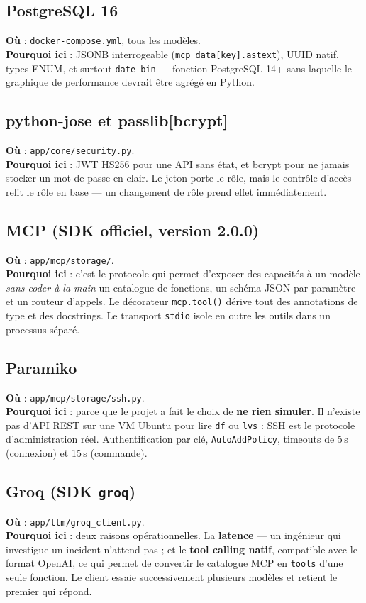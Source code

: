 \documentclass[11pt,a4paper]{report}
\newcommand{\file}[1]{\texttt{\small #1}}
\begin{document}
\subsection{PostgreSQL 16}
\textbf{Où} : \file{docker-compose.yml}, tous les modèles.\\
\textbf{Pourquoi ici} : JSONB interrogeable (\texttt{mcp\_data[key].astext}),
UUID natif, types ENUM, et surtout \texttt{date\_bin} --- fonction PostgreSQL
14+ sans laquelle le graphique de performance devrait être agrégé en Python.

\subsection{python-jose et passlib[bcrypt]}
\textbf{Où} : \file{app/core/security.py}.\\
\textbf{Pourquoi ici} : JWT HS256 pour une API sans état, et bcrypt pour ne
jamais stocker un mot de passe en clair. Le jeton porte le rôle, mais le contrôle
d'accès relit le rôle en base --- un changement de rôle prend effet
immédiatement.

\subsection{MCP (SDK officiel, version 2.0.0)}
\textbf{Où} : \file{app/mcp/storage/}.\\
\textbf{Pourquoi ici} : c'est le protocole qui permet d'exposer des capacités à
un modèle \emph{sans coder à la main} un catalogue de fonctions, un schéma JSON
par paramètre et un routeur d'appels. Le décorateur \texttt{mcp.tool()} dérive
tout des annotations de type et des docstrings. Le transport \texttt{stdio}
isole en outre les outils dans un processus séparé.

\subsection{Paramiko}
\textbf{Où} : \file{app/mcp/storage/ssh.py}.\\
\textbf{Pourquoi ici} : parce que le projet a fait le choix de \textbf{ne rien
simuler}. Il n'existe pas d'API REST sur une VM Ubuntu pour lire \texttt{df} ou
\texttt{lvs} : SSH est le protocole d'administration réel. Authentification par
clé, \texttt{AutoAddPolicy}, timeouts de 5\,s (connexion) et 15\,s (commande).

\subsection{Groq (SDK \texttt{groq})}
\textbf{Où} : \file{app/llm/groq\_client.py}.\\
\textbf{Pourquoi ici} : deux raisons opérationnelles. La \textbf{latence} ---
un ingénieur qui investigue un incident n'attend pas ; et le \textbf{tool
calling natif}, compatible avec le format OpenAI, ce qui permet de convertir le
catalogue MCP en \texttt{tools} d'une seule fonction. Le client essaie
successivement plusieurs modèles et retient le premier qui répond.
\end{document}

